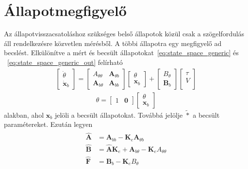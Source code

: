 \section{Állapotmegfigyelő}
Az állapotvisszacsatoláshoz szükséges belső állapotok közül csak a szögelfordulás
áll rendelkezésre közvetlen mérésből. A többi állapotra egy megfigyelő ad becslést.
Elkülönítve a mért és becsült állapotokat~\ref{eq:state_space_generic} és ~\ref{eq:state_space_generic_out} felírható
\begin{align}
    \begin{bmatrix}
        \dot\theta \\
        \dot{\bm x}_b
    \end{bmatrix}
    =
    \begin{bmatrix}
        A_{\theta\theta} & \bm A_{\theta b} \\
        \bm A_{b \theta} & \bm A_{bb}
    \end{bmatrix}
    \begin{bmatrix}
        \theta \\
        \bm x_b
    \end{bmatrix}
    +
    \begin{bmatrix}
        B_\theta \\
        \bm B_b
    \end{bmatrix}
    \begin{bmatrix}
        \tau \\
        V \\
    \end{bmatrix}
\end{align}
\begin{align}\label{eq:observer_out}
    \theta = 
    \begin{bmatrix}
        1 & \bm 0
    \end{bmatrix}
    \begin{bmatrix}
        \theta \\
        \bm x_b
    \end{bmatrix}
\end{align}
alakban, ahol $\bm{x}_b$ jelöli a becsült állapotokat. Továbbá jelölje $\tilde{*}$ 
a becsült paramétereket. Ezután legyen
\begin{align}
    \begin{split}
    \hat{\bm A} &= \bm A_{bb} - \bm K_e \bm A_{\theta b} \\
    \hat{\bm B} &= \hat{\bm A} \bm K_e + \bm A_{b \theta} - \bm K_e A_{\theta \theta} \\
    \hat{\bm F} &= \bm B_b - \bm K_e B_\theta
    \end{split}
\end{align}
